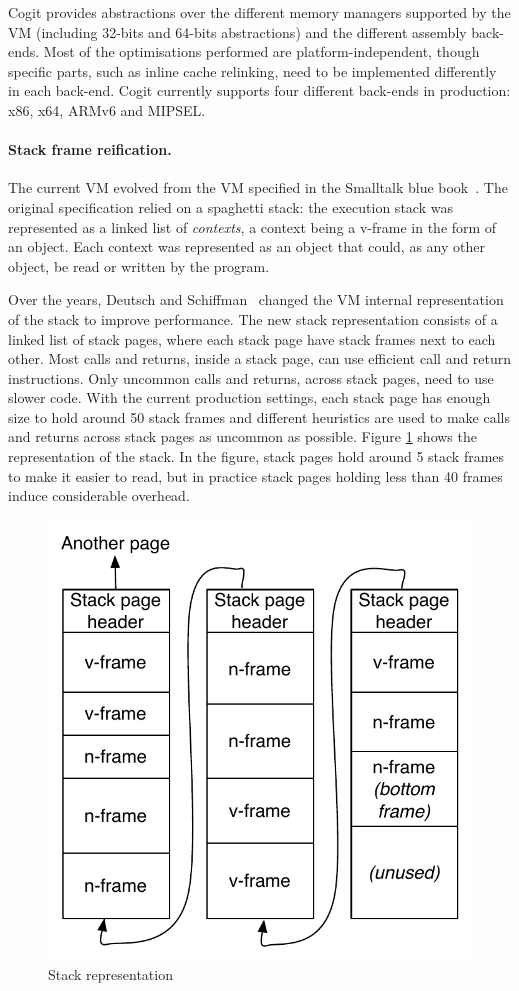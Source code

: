 \documentclass[a4paper,12pt,twoside]{../includes/ThesisStyle}
\begin{document}
Cogit provides abstractions over the different memory managers supported by the VM (including 32-bits and 64-bits abstractions) and the different assembly back-ends. Most of the optimisations performed are platform-independent, though specific parts, such as inline cache relinking, need to be implemented differently in each back-end. Cogit currently supports four different back-ends in production: x86, x64, ARMv6 and MIPSEL.

\paragraph{Stack frame reification.}
\label{par:frameToContext}
The current VM evolved from the VM specified in the Smalltalk blue book~\cite{Gold83a}. The original specification relied on a spaghetti stack: the execution stack was represented as a linked list of \emph{contexts}, a context being a v-frame in the form of an object. Each context was represented as an object that could, as any other object, be read or written by the program. 

Over the years, Deutsch and Schiffman~\cite{Deut84a} changed the VM internal representation of the stack to improve performance. The new stack representation consists of a linked list of stack pages, where each stack page have stack frames next to each other. Most calls and returns, inside a stack page, can use efficient call and return instructions. Only uncommon calls and returns, across stack pages, need to use slower code. With the current production settings, each stack page has enough size to hold around 50 stack frames and different heuristics are used to make calls and returns across stack pages as uncommon as possible. Figure \ref{fig:StackRepresentation} shows the representation of the stack. In the figure, stack pages hold around 5 stack frames to make it easier to read, but in practice stack pages holding less than 40 frames induce considerable overhead.

\begin{figure}[h!]
    \begin{center}
        \includegraphics[width=0.52\linewidth]{StackRepresentation}
        \caption{Stack representation}
        \label{fig:StackRepresentation}
    \end{center}
\end{figure}
\end{document}
